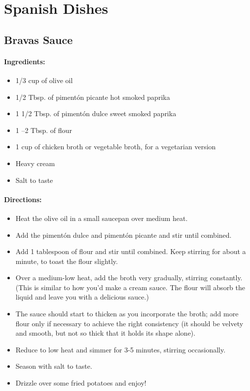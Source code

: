 \documentclass{article}
\begin{document}
\section{Spanish Dishes}


\subsection{Bravas Sauce}

\paragraph{Ingredients:}

\begin{itemize}
	\item 1/3 cup of olive oil
	\item 1/2 Tbsp. of pimentón picante hot smoked paprika
	\item 1 1/2 Tbsp. of pimentón dulce sweet smoked paprika
	\item 1 –2 Tbsp. of flour
	\item 1 cup of chicken broth or vegetable broth, for a vegetarian version
	\item Heavy cream
	\item Salt to taste
\end{itemize}

\paragraph{Directions:}
\begin{itemize}
	\item Heat the olive oil in a small saucepan over medium heat.
	\item Add the pimentón dulce and pimentón picante and stir until combined.
	\item Add 1 tablespoon of flour and stir until combined. Keep stirring for about a minute, to toast the flour slightly.
	\item Over a medium-low heat, add the broth very gradually, stirring constantly. (This is similar to how you'd make a cream sauce. The flour will absorb the liquid and leave you with a delicious sauce.)
	\item The sauce should start to thicken as you incorporate the broth; add more flour only if necessary to achieve the right consistency (it should be velvety and smooth, but not so thick that it holds its shape alone).
	\item Reduce to low heat and simmer for 3-5 minutes, stirring occasionally.
	\item Season with salt to taste.
	\item Drizzle over some fried potatoes and enjoy!
\end{itemize}
\end{document}
